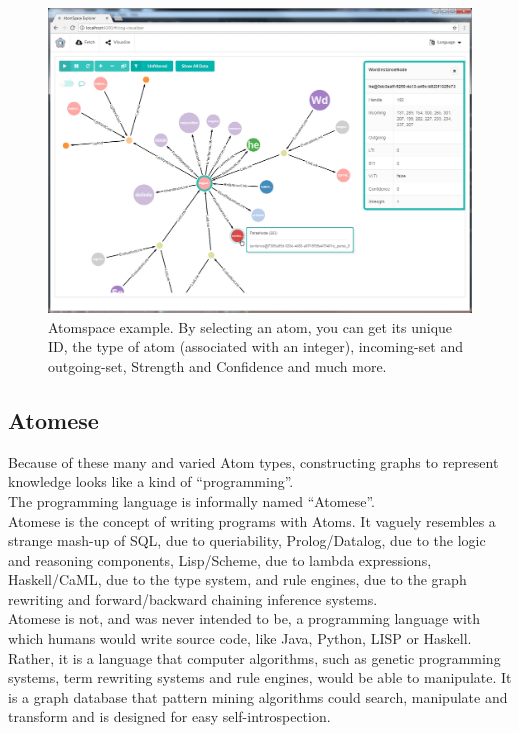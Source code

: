 \begin{figure}[h]
\centering
\includegraphics[width=1.0
\textwidth]{figures/Magistrale/atomspace_explorer}
\caption[AtomSpace Explorer ]{Atomspace example. By selecting an atom, you can get its unique ID, the type of atom (associated with an integer), incoming-set and outgoing-set, Strength and Confidence and much more.
\label{fig:atomspace_explorer}}
\end{figure}


\subsection{Atomese}\label{sec:atomese}

Because of these many and varied Atom types, constructing graphs to represent knowledge looks like a kind of \enquote{programming}. \\
The programming language is informally named \enquote{Atomese}. \\ 
Atomese is the concept of writing programs with Atoms. 
It vaguely resembles a strange mash-up of SQL, due to queriability, Prolog/Datalog, due to the logic and reasoning components, Lisp/Scheme, due to lambda expressions, Haskell/CaML, due to the type system, and rule engines, due to the graph rewriting and forward/backward chaining inference systems. \\

Atomese is not, and was never intended to be, a programming language with which humans would write source code, like Java, Python, LISP or Haskell. 
Rather, it is a language that computer algorithms, such as genetic programming systems, term rewriting systems and rule engines, would be able to manipulate. 
It is a graph database that pattern mining algorithms could search, manipulate and transform and is designed for easy self-introspection. \\

